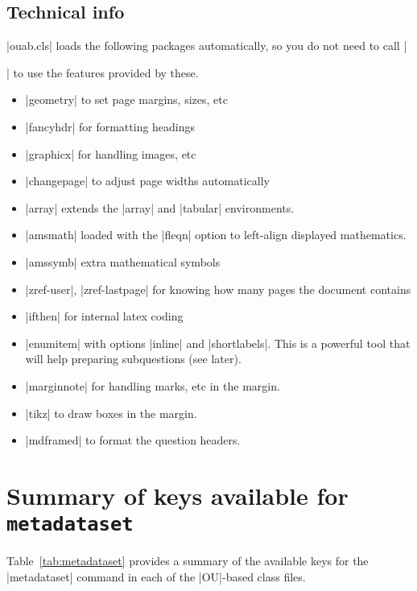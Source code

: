 \documentclass[a4paper]{ltxguide}
\newcommand\3{\unskip\enspace\fbox{\fontsize{4}{4}\selectfont NEW 3.0}}
\begin{document}
\subsection{Technical info}

|ouab.cls| loads the following packages automatically, so you do not need to call |\usepackage{...}| to use the features provided by these.

\begin{itemize}
\item |geometry| to set page margins, sizes, etc
\item |fancyhdr| for formatting headings
\item |graphicx| for handling images, etc
\item |changepage| to adjust page widths automatically
\item |array| extends the |array| and |tabular| environments.
\item |amsmath| loaded with the |fleqn| option to left-align displayed mathematics.
\item |amssymb| extra mathematical symbols
\item |zref-user|, |zref-lastpage| for knowing how many pages the document contains
\item |ifthen| for internal latex coding
\item |enumitem| with options |inline| and |shortlabels|. This is a powerful tool that will help preparing subquestions (see later).
\item |marginnote| for handling marks, etc in the margin.
\item |tikz| to draw boxes in the margin.
\item |mdframed| to format the question headers.
\end{itemize}




%
%
%
%
%
%
%
%
%
%

\section{Summary of keys available for \texttt{metadataset}}
Table~\ref{tab:metadataset} provides a summary of the available keys
for the |metadataset| command in each of the |OU|-based class files.
\end{document}
